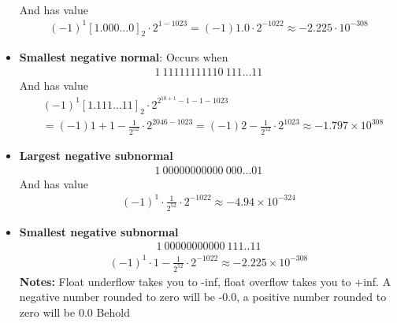\documentclass{report}
\begin{document}
\begin{itemize}
\begin{align*}
                \end{align*}
                And has value
                \begin{align*}
                    (-1)^{1}[1.000...0]_{2} \cdot 2^{1-1023}  = (-1) 1.0 \cdot 2^{-1022} \approx -2.225 \cdot 10^{-308}
                \end{align*}
            \item \textbf{Smallest negative normal}: Occurs when
                \begin{align*}
                    1 \ 11111111110 \ 111...11
                \end{align*}
                And has value
                \begin{align*}
                    &(-1)^{1}[1.111...11]_{2} \cdot 2^{2^{10+1} -1 - 1-1023} \\
                    &=(-1) 1 + 1- \frac{1}{2^{52}} \cdot 2^{2046 -1023} = (-1) 2 - \frac{1}{2^{52}} \cdot 2^{1023} \approx -1.797 \times 10^{308}
                \end{align*}
            \item \textbf{Largest negative subnormal}
                \begin{align*}
                   1 \ 00000000000 \ 000...01 
                \end{align*}
                And has value
                \begin{align*}
                    (-1)^{1} \cdot \frac{1}{2^{52}} \cdot 2^{-1022} \approx -4.94 \times 10^{-324}
                \end{align*}
            \item \textbf{Smallest negative subnormal}
                \begin{align*}
                    1 \ 00000000000 \ 111..11
                \end{align*}
                \begin{align*}
                    (-1)^{1} \cdot 1-\frac{1}{2^{52}} \cdot 2^{-1022} \approx -2.225 \times 10^{-308}
                \end{align*}
                \bigbreak \noindent 
                \textbf{Notes:} Float underflow takes you to -inf, float overflow takes you to +inf. A negative number rounded to zero will be -0.0, a positive number rounded to zero will be 0.0
                \bigbreak \noindent 
                Behold
                \bigbreak \noindent 
                \begin{figure}[ht]
                    \centering

\end{figure}
\end{itemize}
\end{document}
